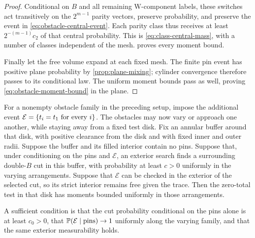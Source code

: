 \begin{proof}
Conditional on $B$ and all remaining W-component labels, these switches
act transitively on the $2^{m-1}$ parity vectors, preserve probability,
and preserve the event in \eqref{eq:obstacle-central-event}.  Each parity
class thus receives at least $2^{-(m-1)}c_2$ of that central probability.
This is \eqref{eq:class-central-mass}, with a number of classes independent
of the mesh.   proves every moment bound.

Finally let the free volume expand at each fixed mesh.  The finite pin
event has positive plane probability by \cref{prop:plane-mixing}; cylinder
convergence therefore passes to its conditional law.  The uniform moment
bounds pass as well, proving \eqref{eq:obstacle-moment-bound} in the plane.
\end{proof}

\begin{corollary}
\label{cor:equal-offset-moments}
For a nonempty obstacle family in the preceding setup, impose the additional event
$\mathcal E=\{t_i=t_1\hbox{ for every }i\}$.  The obstacles may now vary
or approach one another, while staying away from a fixed test disk.
Fix an annular buffer around that disk, with positive clearance from
the disk and with fixed inner and outer radii.  Suppose the buffer and
its filled interior contain no pins.
Suppose that, under conditioning on the pins and $\mathcal E$, an exterior
search finds a surrounding double-$B$ cut in this buffer, with probability
at least $c>0$ uniformly in the varying arrangements.  Suppose that
$\mathcal E$ can be checked in the exterior of the selected cut, so its
strict interior remains free given the trace.  Then the zero-total test
in that disk has moments bounded uniformly in those arrangements.

A sufficient condition is that the cut probability conditional on the
pins alone is at least $c_0>0$, that
$\mathbb P(\mathcal E\mid\hbox{pins})\to1$ uniformly along the varying family,
and that the same exterior measurability holds.
\end{corollary}

